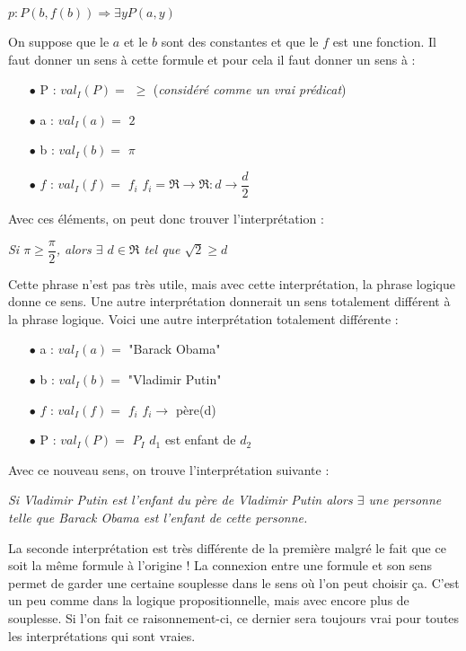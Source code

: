 \begin{center}
$p : P(b,f(b)) \Rightarrow \exists y   P(a,y)$  \\
\vspace{3mm}
\end{center}
On suppose que le $a$ et le $b$ sont des constantes et que le $f$ est une fonction. Il faut donner un sens à cette formule et pour cela il faut donner un sens à : 
\begin{itemize}
\item[$\bullet$]P : $val_{I}(P) = $ $ \geq $ \hspace{3mm} (\textit{considéré comme un vrai prédicat})
\item[$\bullet$] a : $val_{I}(a) = $ $ 2 $ 
\item[$\bullet$] b : $val_{I}(b) = $ $ \pi $ 
\item[$\bullet$] $f$ : $val_{I}(f) = $ $ f_{i} $ \hspace{3mm} $f_{i}= \Re \rightarrow \Re : d \rightarrow \dfrac{d}{2} $ 
\end{itemize}
Avec ces éléments, on peut donc trouver l'interprétation : 
\begin{center}
\textit{Si $\pi \geq  \dfrac{\pi}{2}$, alors $\exists$ $ d \in \Re$ tel que $\sqrt2 \geq d$ }
\end{center}
Cette phrase n'est pas très utile, mais avec cette interprétation, la phrase logique donne ce sens. Une autre interprétation donnerait un sens totalement différent à la phrase logique. Voici une autre interprétation totalement différente :
\begin{itemize}
\item[$\bullet$] a : $val_{I}(a) = $ "Barack Obama"
\item[$\bullet$] b : $val_{I}(b) = $ "Vladimir Putin"
\item[$\bullet$] $f$ : $val_{I}(f) = $ $ f_{i} $ \hspace{3mm} $f_{i} \rightarrow$ père(d) 
\item[$\bullet$] P :  $val_{I}(P) = $ $P_{I}$ \hspace{3mm} $d_{1}$ est enfant de $d_{2}$\\
\end{itemize}

Avec ce nouveau sens, on trouve l'interprétation suivante : 
\begin{center}
\textit{Si Vladimir Putin est l'enfant du père de Vladimir Putin alors $\exists$ une personne telle que Barack Obama est l'enfant de cette personne.}
\end{center}
La seconde interprétation est très différente de la première malgré le fait que ce soit la même formule à l'origine ! La connexion entre une formule et son sens permet de garder une certaine souplesse dans le sens où l'on peut choisir ça. C'est un peu comme dans la logique propositionnelle, mais avec encore plus de souplesse. Si l'on fait ce raisonnement-ci, ce dernier sera toujours vrai pour toutes les interprétations qui sont vraies. \\

